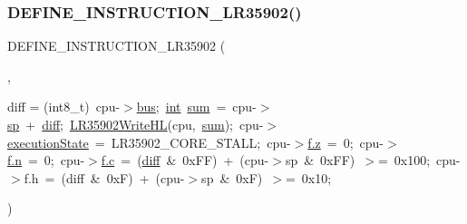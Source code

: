 \mbox{\label{isa-lr35902_8c_ad123a82b55ad568312f5079d214c9024}} 
\subsubsection{\texorpdfstring{D\+E\+F\+I\+N\+E\+\_\+\+I\+N\+S\+T\+R\+U\+C\+T\+I\+O\+N\+\_\+\+L\+R35902()}{DEFINE\_INSTRUCTION\_LR35902()}\hspace{0.1cm}{\footnotesize\ttfamily [7/20]}}
{\footnotesize\ttfamily D\+E\+F\+I\+N\+E\+\_\+\+I\+N\+S\+T\+R\+U\+C\+T\+I\+O\+N\+\_\+\+L\+R35902 (\begin{DoxyParamCaption}\item[{L\+D\+H\+L\+\_\+\+S\+P\+Delay}]{,  }\item[{\mbox{\hyperlink{ioapi_8h_a787fa3cf048117ba7123753c1e74fcd6}{int}}}]{diff = {\ttfamily (int8\+\_\+t)~cpu-\/$>$\mbox{\hyperlink{isa-lr35902_8c_a6163e7e073b87ad067db0a3b10da6be9}{bus}};~\mbox{\hyperlink{ioapi_8h_a787fa3cf048117ba7123753c1e74fcd6}{int}}~\mbox{\hyperlink{isa-lr35902_8c_a930b83edda39ee8cfa78dd4574a50bc3}{sum}}~=~cpu-\/$>$\mbox{\hyperlink{isa-lr35902_8c_a2a917b9f439b612ee0161cab4c4d0568}{sp}}~+~\mbox{\hyperlink{isa-lr35902_8c_a65f3a8178e1f997a7a19a988bb0f4e1a}{diff}};~\mbox{\hyperlink{isa-lr35902_8c_a4e59a8175a58c35aba094ac7bb13fddd}{L\+R35902\+Write\+HL}}(cpu,~\mbox{\hyperlink{isa-lr35902_8c_a930b83edda39ee8cfa78dd4574a50bc3}{sum}});~cpu-\/$>$\mbox{\hyperlink{isa-lr35902_8c_a087a53d4d283226a73c530dd2883d634}{execution\+State}}~=~LR35902\+\_\+CORE\+\_\+STALL;~cpu-\/$>$\mbox{\hyperlink{isa-lr35902_8c_a9bfcf38888761332515ae81f9c499233}{f.\+z}}~=~0;~cpu-\/$>$\mbox{\hyperlink{isa-lr35902_8c_ae54e54065504090672c92ef62a1c5f05}{f.\+n}}~=~0;~cpu-\/$>$\mbox{\hyperlink{isa-lr35902_8c_ab27f9f98dd173bfc694f5d161e839d6e}{f.\+c}}~=~(\mbox{\hyperlink{isa-lr35902_8c_a65f3a8178e1f997a7a19a988bb0f4e1a}{diff}}~\&~0xFF)~+~(cpu-\/$>$sp~\&~0xFF)~$>$=~0x100;~cpu-\/$>$f.h~=~(diff~\&~0xF)~+~(cpu-\/$>$sp~\&~0xF)~$>$=~0x10;} }\end{DoxyParamCaption})}

\mbox{\label{isa-lr35902_8c_ad7831ced68ab7075a7d03b96ff5fa8b9}} 
